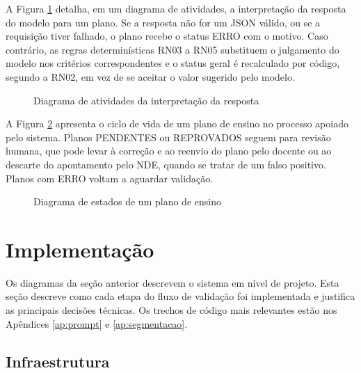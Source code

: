 A Figura \ref{fig:atividade} detalha, em um diagrama de atividades, a interpretação da resposta do modelo para um plano. Se a resposta não for um JSON válido, ou se a requisição tiver falhado, o plano recebe o status ERRO com o motivo. Caso contrário, as regras determinísticas RN03 a RN05 substituem o julgamento do modelo nos critérios correspondentes e o status geral é recalculado por código, segundo a RN02, em vez de se aceitar o valor sugerido pelo modelo.

\begin{figure}[htbp]
\centering
\caption{Diagrama de atividades da interpretação da resposta}
\label{fig:atividade}

\end{figure}

A Figura \ref{fig:estados} apresenta o ciclo de vida de um plano de ensino no processo apoiado pelo sistema. Planos PENDENTES ou REPROVADOS seguem para revisão humana, que pode levar à correção e ao reenvio do plano pelo docente ou ao descarte do apontamento pelo NDE, quando se tratar de um falso positivo. Planos com ERRO voltam a aguardar validação.

\begin{figure}[htbp]
\centering
\caption{Diagrama de estados de um plano de ensino}
\label{fig:estados}
\resizebox{\textwidth}{!}{}
\end{figure}

\section{Implementação}
\label{sec:implementacao}

Os diagramas da seção anterior descrevem o sistema em nível de projeto. Esta seção descreve como cada etapa do fluxo de validação foi implementada e justifica as principais decisões técnicas. Os trechos de código mais relevantes estão nos Apêndices \ref{ap:prompt} e \ref{ap:segmentacao}.

\subsection{Infraestrutura}

